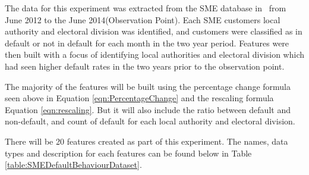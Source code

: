 The data for this experiment was extracted from the SME database in \subjectname\ from June 2012 to the June 2014(Observation Point). Each SME customers local authority and electoral division was identified, and customers were classified as in default or not in default for each month in the two year period. Features were then built with a focus of identifying local authorities and electoral division which had seen higher default rates in the two years prior to the observation point. 

The majority of the features will be built using the percentage change formula seen above in Equation \ref{eqn:PercentageChange} and the rescaling formula Equation \ref{eqn:rescaling}. But it will also include the ratio between default and non-default, and count of default for each local authority and electoral division.

There will be 20 features created as part of this experiment. The names, data types and description for each features can be found below in Table \ref{table:SMEDefaultBehaviourDataset}.

